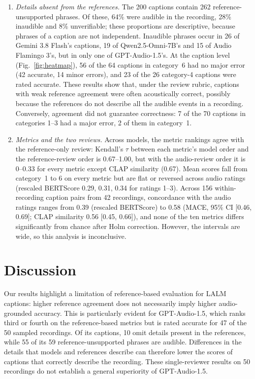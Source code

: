 \documentclass{article}
\newcommand{\gpt}{GPT-Audio-1.5}
\newcommand{\gem}{Gemini 3.8 Flash}
\newcommand{\qwen}{Qwen2.5-Omni-7B}
\newcommand{\af}{Audio Flamingo 3}
\begin{document}
\begin{enumerate}
\item \emph{Details absent from the references.} The 200 captions contain 262 reference-unsupported phrases. Of these, 64\%
were audible in the recording, 28\% inaudible and 8\% unverifiable; these proportions are descriptive, because phrases
of a caption are not independent. Inaudible phrases occur in 26 of \gem's captions, 19 of \qwen's and 15 of
\af's, but in only one of \gpt's. At the caption level (Fig.~\ref{fig:heatmap}), 56 of the 64 captions in category~6
had no major error (42 accurate, 14 minor errors), and 23 of the 26 category-4 captions were rated accurate. These
results show that, under the review rubric, captions with weak reference agreement were often acoustically correct,
possibly because the references do not describe all the audible events in a recording. Conversely,
agreement did not guarantee correctness: 7 of the 70 captions in categories 1--3 had a major error, 2 of them in
category~1.
\item \emph{Metrics and the two reviews.} Across models, the metric rankings agree with the reference-only review: Kendall's $\tau$
between each metric's model order and the reference-review order is 0.67--1.00, but with the audio-review order it is
0--0.33 for every metric except CLAP similarity (0.67). Mean scores fall from category~1 to 6 on every
metric but are flat or reversed across audio ratings (rescaled BERTScore 0.29, 0.31, 0.34 for ratings 1--3). Across 156 within-recording caption pairs from 42 recordings, concordance with the
audio ratings ranges from 0.39 (rescaled BERTScore) to 0.58 (MACE, 95\% CI [0.46, 0.69]; CLAP similarity 0.56 [0.45,
0.66]), and none of the ten metrics differs significantly from chance after Holm correction. However, the intervals are
wide, so this analysis is inconclusive.
\end{enumerate}

\section{Discussion}
\label{sec:discussion}

Our results highlight a limitation of reference-based evaluation for LALM captions: higher reference agreement
does not necessarily imply higher audio-grounded accuracy. This is particularly evident
for \gpt, which ranks third or fourth on the reference-based metrics but is rated accurate for 47 of the 50 sampled
recordings. Of its captions, 10 omit details present in the references, while 55 of its 59 reference-unsupported
phrases are audible. Differences in the details that models and references describe can therefore lower the scores of
captions that correctly describe the recording. These single-reviewer results on 50 recordings do not establish a
general superiority of \gpt.
\end{document}
